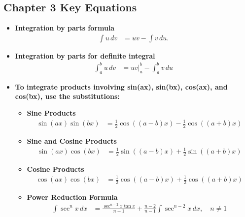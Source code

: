 \documentclass{report}
\begin{document}
    \pagebreak \bigbreak \noindent 
    \subsection{Chapter 3 Key Equations}
    \bigbreak \noindent 
    \begin{itemize}
        \item \textbf{Integration by parts formula} 
            \begin{align*}
                \int u \, dv &= uv - \int v \, du 
            .\end{align*}
        \item \textbf{Integration by parts for definite integral}
            \begin{align*}
                \int_{a}^{b} u \, dv &= uv\big|_{a}^{b} - \int_{a}^{b} v \, du
            \end{align*}
        \item \textbf{To integrate products involving  sin(ax), sin(bx), cos(ax), and  cos(bx), use the substitutions:}
            \begin{itemize}
                \item \textbf{Sine Products}
                \begin{align*}
                    \sin(ax) \sin(bx) &= \frac{1}{2} \cos((a-b)x) - \frac{1}{2} \cos((a+b)x)
                \end{align*}

                \item \textbf{Sine and Cosine Products}
                \begin{align*}
                    \sin(ax) \cos(bx) &= \frac{1}{2} \sin((a-b)x) + \frac{1}{2} \sin((a+b)x)
                \end{align*}

                \item \textbf{Cosine Products}
                \begin{align*}
                    \cos(ax) \cos(bx) &= \frac{1}{2} \cos((a-b)x) + \frac{1}{2} \cos((a+b)x)
                \end{align*}

                \item \textbf{Power Reduction Formula}
                \begin{align*}
                    \int \sec^n x \, dx &= \frac{\sec^{n-2}x \tan{x}}{n-1} + \frac{n-2}{n-1} \int \sec^{n-2}x \, dx, \quad n \neq 1
                \end{align*}


\end{itemize}
\end{itemize}
\end{document}
